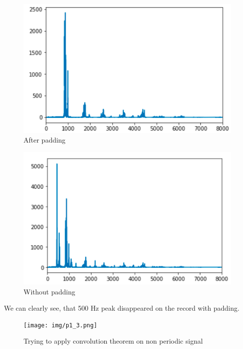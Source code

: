 \documentclass[a4paper]{article}
\begin{document}
        \begin{figure}[H]
            \centering
            \includegraphics[width=\textwidth]{img/p1_1.png}
            \caption{After padding}
            \label{fig:p1_2}
        \end{figure}
        
        \begin{figure}[H]
            \centering
            \includegraphics[width=\textwidth]{img/p1_2.png}
            \caption{Without padding}
            \label{fig:p1_2}
        \end{figure}
        
        We can clearly see, that 500 Hz peak disappeared on the record with padding.
        
        \begin{figure}[H]
            \centering
            \texttt{[image: img/p1\_3.png]}
            \caption{Trying to apply convolution theorem on non periodic signal}
            \label{fig:p1_1}
        \end{figure}
        
\end{document}
